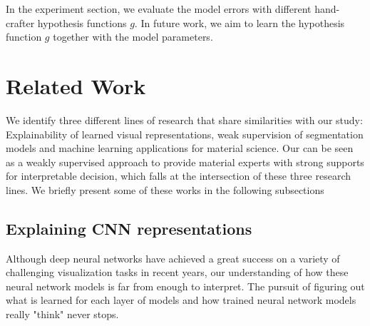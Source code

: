 \documentclass[10pt,twocolumn,letterpaper]{article}
\begin{document}
In the experiment section, we evaluate the model errors with different hand-crafter hypothesis functions $g$.
In future work, we aim to learn the hypothesis function $g$ together with the model parameters.


\section{Related Work}

We identify three different lines of research that share similarities with our study:
Explainability of learned visual representations, 
weak supervision of segmentation models and 
machine learning applications for material science.
Our can be seen as a weakly supervised approach to provide material 
experts with strong supports for interpretable decision, 
which falls at the intersection of these three research lines.
We briefly present some of these works in the following subsections

\subsection{Explaining CNN representations}
Although deep neural networks have achieved a great success on a variety 
of challenging visualization tasks in recent years, 
our understanding of how these neural network models is far from enough to interpret.
The pursuit of figuring out what is learned for each layer of models 
and how trained neural network models really "think" never stops.
\end{document}

